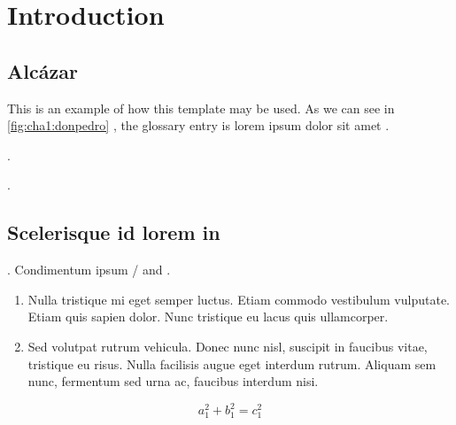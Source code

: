% 
% 
% 



\clearpage
\cleardoublepage

\chapter{Introduction}

\section{Alcázar}

This is an example of how this template may be used. As we can see in \autoref{fig:cha1:donpedro} \cite{cubesat-impact-astronomy, lora-phy-understanding}, the glossary entry  is lorem ipsum dolor sit amet  \cite{nasa-soa2023-avionics, book-product-devel, maral-satcoms, solder-defects}.

\lipsum[12] \cite{cubesat-impact-astronomy}.


\lipsum[1] \cite{solder-defects}.

\section{Scelerisque id lorem in}

\lipsum[13]. Condimentum ipsum / and  \cite{grounding-schemes-sats}. 
\begin{enumerate}
    \item Nulla tristique mi eget semper luctus. Etiam commodo vestibulum vulputate. Etiam quis sapien dolor. Nunc tristique eu lacus quis ullamcorper. 
    \item Sed volutpat rutrum vehicula. Donec nunc nisl, suscipit in faucibus vitae, tristique eu risus. Nulla facilisis augue eget interdum rutrum. Aliquam sem nunc, fermentum sed urna ac, faucibus interdum nisi.
\end{enumerate}
\begin{equation}
        a_1^2 + b_1^2 = c_1^2
\end{equation}

